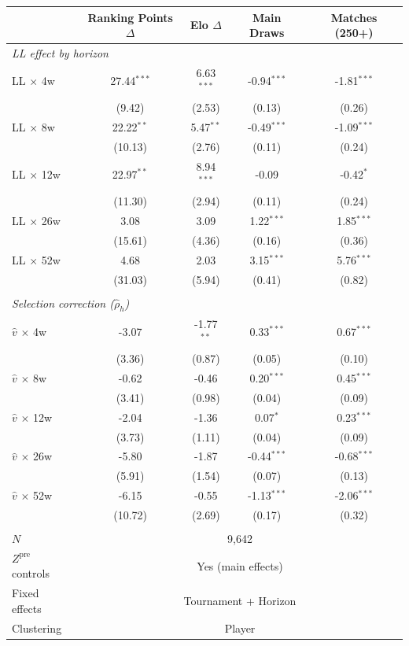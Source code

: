 \begin{tabular}{lcccc}
\toprule
 & Ranking Points $\Delta$ & Elo $\Delta$ & Main Draws & Matches (250+) \\
\midrule
\multicolumn{5}{l}{\textit{LL effect by horizon}} \\
\quad LL $\times$ 4w & 27.44$^{***}$ & 6.63$^{***}$ & -0.94$^{***}$ & -1.81$^{***}$ \\
 & (9.42) & (2.53) & (0.13) & (0.26) \\
\quad LL $\times$ 8w & 22.22$^{**}$ & 5.47$^{**}$ & -0.49$^{***}$ & -1.09$^{***}$ \\
 & (10.13) & (2.76) & (0.11) & (0.24) \\
\quad LL $\times$ 12w & 22.97$^{**}$ & 8.94$^{***}$ & -0.09 & -0.42$^{*}$ \\
 & (11.30) & (2.94) & (0.11) & (0.24) \\
\quad LL $\times$ 26w & 3.08 & 3.09 & 1.22$^{***}$ & 1.85$^{***}$ \\
 & (15.61) & (4.36) & (0.16) & (0.36) \\
\quad LL $\times$ 52w & 4.68 & 2.03 & 3.15$^{***}$ & 5.76$^{***}$ \\
 & (31.03) & (5.94) & (0.41) & (0.82) \\
\\[0.3em]
\multicolumn{5}{l}{\textit{Selection correction ($\hat{\rho}_h$)}} \\
\quad $\hat{v}$ $\times$ 4w & -3.07 & -1.77$^{**}$ & 0.33$^{***}$ & 0.67$^{***}$ \\
 & (3.36) & (0.87) & (0.05) & (0.10) \\
\quad $\hat{v}$ $\times$ 8w & -0.62 & -0.46 & 0.20$^{***}$ & 0.45$^{***}$ \\
 & (3.41) & (0.98) & (0.04) & (0.09) \\
\quad $\hat{v}$ $\times$ 12w & -2.04 & -1.36 & 0.07$^{*}$ & 0.23$^{***}$ \\
 & (3.73) & (1.11) & (0.04) & (0.09) \\
\quad $\hat{v}$ $\times$ 26w & -5.80 & -1.87 & -0.44$^{***}$ & -0.68$^{***}$ \\
 & (5.91) & (1.54) & (0.07) & (0.13) \\
\quad $\hat{v}$ $\times$ 52w & -6.15 & -0.55 & -1.13$^{***}$ & -2.06$^{***}$ \\
 & (10.72) & (2.69) & (0.17) & (0.32) \\
\\[0.3em]
\midrule
$N$ & \multicolumn{4}{c}{9,642} \\
$Z^{\text{pre}}$ controls & \multicolumn{4}{c}{Yes (main effects)} \\
Fixed effects & \multicolumn{4}{c}{Tournament + Horizon} \\
Clustering & \multicolumn{4}{c}{Player} \\
\bottomrule
\end{tabular}
